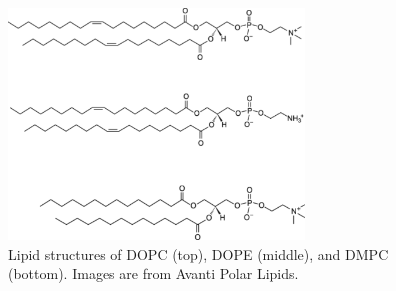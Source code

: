 \begin{figure}
  \centering
  \includegraphics[width=0.7\textwidth]{figures/lipid_structure}
  \caption{Lipid structures of DOPC (top), DOPE (middle),
  and DMPC (bottom). Images are from Avanti Polar Lipids.}
  \label{fig:lipid_structure}
\end{figure}

